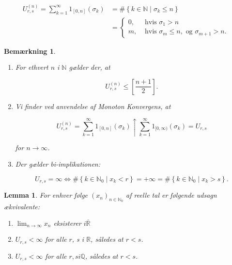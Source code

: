 \documentclass{article}
\newcommand{\1}{\mathbbm{1}}
\theoremstyle{boxed}
\newtheorem{lemma}[theorem]{Lemma}
\newtheorem{remark}[theorem]{Bemærkning}
\begin{document}
$$
\begin{aligned}
U_{r, s}^{(n)}=\sum_{k=1}^{\infty} 1_{[0, n]}\left(\sigma_k\right) & =\#\left\{k \in \mathbb{N} \mid \sigma_k \leq n\right\} \\
& = \begin{cases}0, & \text { hvis } \sigma_1>n \\
m, & \text { hvis } \sigma_m \leq n, \text { og } \sigma_{m+1}>n .\end{cases}
\end{aligned}
$$
\begin{remark}
    \begin{enumerate}
        \item For ethvert $n$ i $\mathbb{N}$ gælder der, at

        $$
        U_{r, s}^{(n)} \leq\left[\frac{n+1}{2}\right] .
        $$
        
\item Vi finder ved anvendelse af Monoton Konvergens, at

$$
U_{r, s}^{(n)}=\sum_{k=1}^{\infty} 1_{[0, n]}\left(\sigma_k\right) \uparrow \sum_{k=1}^{\infty} 1_{[0, \infty)}\left(\sigma_k\right)=U_{r, s}
$$

for $n \rightarrow \infty$.
 \item Der gælder bi-implikationen:

 $$
 U_{r, s}=\infty \Longleftrightarrow \#\left\{k \in \mathbb{N}_0 \mid x_k<r\right\}=+\infty=\#\left\{k \in \mathbb{N}_0 \mid x_k>s\right\} .
 $$
 
    \end{enumerate}
\end{remark}
\begin{theorem-box}
    \begin{lemma}
        For enhver følge $\left(x_n\right)_{n \in \mathbb{N}_0}$ af reelle tal er følgende udsagn ækvivalente:
\begin{enumerate}
    \item[\textnormal{(i)}] $\lim _{n \rightarrow \infty} x_n$ eksisterer $i \overline{\mathbb{R}}$
    \item[\textnormal{(ii)}] $U_{r, s}<\infty$ for alle $r$, s i $\mathbb{R}$, således at $r<s$.
    \item[\textnormal{(iii)}]  $U_{r, s}<\infty$ for alle $r, s i \mathbb{Q}$, således at $r<s$.
\end{enumerate}
    \end{lemma}
\end{theorem-box}
\end{document}
